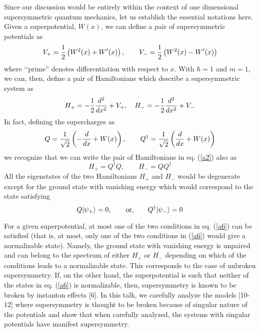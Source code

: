 \documentclass[a4paper,11pt]{article}
\begin{document}
Since our discussion would be entirely within the context of one
dimensional supersymmetric quantum mechanics, let us establish the
essential notations here. Given a superpotential, $W(x)$, we can
define a pair of supersymmetric potentials as
\begin{equation}
 V_{+} = {1\over 2}\left(W^{2}(x) + W'(x)\right),\qquad V_{-} =
 {1\over 2}\left(W^{2}(x) - W'(x)\right)\label{a1}
\end{equation}
where \lq\lq prime'' denotes differentiation with respect to $x$. With
$\hbar =1$ and $m=1$, we can, then, define a pair of Hamiltonians
which describe a supersymmetric system as
\begin{equation}
H_{+} = - {1\over 2}\frac{d^{2}}{dx^{2}} + V_{+},\quad
H_{-} = - {1\over 2}\frac{d^{2}}{dx^{2}} + V_{-}\label{a2}
\end{equation}
In fact, defining the supercharges as
\begin{equation}
Q = {1\over\sqrt{2}}\left(-\frac{d}{dx} + W(x)\right), \qquad
Q^{\dagger} = {1\over\sqrt{2}}\left(\frac{d}{dx} + W(x)\right)\label{a3}
\end{equation}
we recognize that we can write the pair of Hamiltonians in
eq. (\ref{a2}) also as
\begin{equation}
H_{+} = Q^{\dagger}Q, \qquad H_{-} = QQ^{\dagger}\label{a4}
\end{equation}
All the
eigenstates of the two Hamiltonians $H_{+}$ and $H_{-}$ would be
degenerate except for the ground state with vanishing energy which
would correspond to the state satisfying
\begin{equation}
Q|\psi_{+}\rangle = 0, \qquad {\rm or,}\qquad Q^{\dagger}|\psi_{-}\rangle =
0\label{a6} 
\end{equation}

For a given superpotential, at  most one of the two conditions in
eq. (\ref{a6}) can be satisfied (that is, at  most, only one of the
two conditions in (\ref{a6}) would give a normalizable state). Namely,
the ground state with vanishing energy is unpaired and can belong to
the spectrum of either $H_{+}$ or $H_{-}$ depending on which of the
conditions leads to a normalizable state. This corresponds to the case
of unbroken supersymmetry. 
If, on the other hand, the superpotential is such that neither of the
states  in eq. (\ref{a6}) is normalizable, then, supersymmetry is
known  to be broken by instanton effects [6]. 
In this talk, we carefully analyze the models [10-12] where
supersymmetry is thought to be broken because of singular nature of
the potentials and show that when carefully analyzed, the systems with
singular potentials have manifest supersymmetry.
\end{document}
